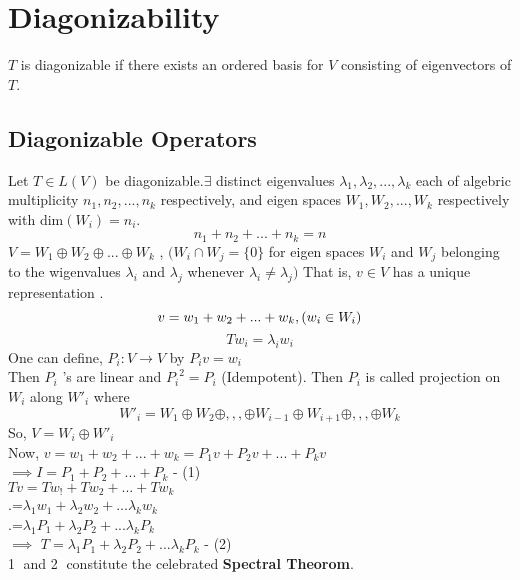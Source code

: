 \documentclass[12pt]{article}
\theoremstyle{definition}
\begin{document}
	  \section{Diagonizability}
	  $T$ is diagonizable if there exists an ordered basis for $V$ consisting of eigenvectors of $T$.
	  \subsection{Diagonizable Operators} 
	  Let $T \in L(V)$ be diagonizable.$\exists$ distinct eigenvalues $\lambda_{1},\lambda_{2},...,\lambda_{k}$ each of algebric multiplicity $n_1,n_2,...,n_k$ respectively, and eigen spaces $W_1,W_2,...,W_k$ respectively with dim$(W_i) = n_i.$
	  $$n_1+n_2+...+n_k = n$$
	  $V = W_1\oplus W_2\oplus...\oplus W_k$ ,\space 
	  $(W_i\cap W_j =\{0\}$ for eigen spaces $W_i$ and $W_j$ belonging to the wigenvalues $\lambda_{i}$ and $\lambda_{j}$ whenever $\lambda_{i} \neq \lambda_{j})$
	  That is, $v \in V$ has a unique representation
	 .
	 $$ v = w_1+w_2+...+w_k , \space (w_i\in W_i)$$
	 $$Tw_i = \lambda_{i}w_i$$
	 One can define, $P_i:V\to V$ by $P_iv = w_i$\\
	 Then $P_i$ 's are linear and ${P_i}^2 = P_i$ (Idempotent). Then $P_i$ is called projection on $W_i$ along ${W\prime}_i$ where $${W\prime}_i= W_1\oplus W_2\oplus,,,\oplus W_{i-1}\oplus W_{i+1}\oplus,,,\oplus W_k$$
	 So, \space $V = W_i\oplus {W\prime}_i$\\
	 Now, $v=w_1+w_2+...+w_k = P_1 v+P_2 v+...+P_k v$\\
	 $\implies \boxed{I = P_1+P_2+...+P_k}$ - (1)
	 \\
	 $Tv = Tw_!+Tw_2+...+Tw_k$\\
	 .\hspace{0.5cm}=$\lambda_{1}w_1+\lambda_{2}w_2+...\lambda_{k}w_k$\\
	 .\hspace{0.5cm}=$\lambda_{1}P_1+\lambda_{2}P_2+...\lambda_{k}P_k$\\
	 $\implies$
	 $\boxed{T= \lambda_{1}P_1+\lambda_{2}P_2+...\lambda_{k}P_k}$ - (2)\\
	 \textcircled{1} and \textcircled{2} constitute the celebrated \textbf{Spectral Theorom}.
	 \\
	 
\end{document}
